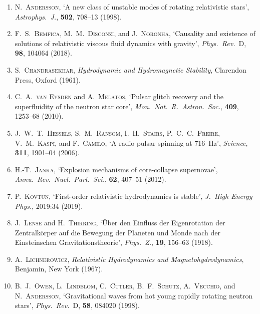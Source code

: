\begin{enumerate}
\item N.~\textsc{Andersson}, `A new class of unstable modes of
  rotating relativistic stars', \emph{Astrophys.\ J.}, \textbf{502},
  708--13 (1998).

\item F.~S.~\textsc{Bemfica}, M.~M.~\textsc{Disconzi}, and
  J.~\textsc{Noronha}, `Causality and existence of solutions of
  relativistic viscous fluid dynamics with gravity',
  \emph{Phys.\ Rev.}~D, \textbf{98}, 104064 (2018).

\item S.~\textsc{Chandrasekhar}, \emph{Hydrodynamic and
  Hydromagnetic Stability}, Clarendon Press, Oxford (1961).

\item C.~A.~\textsc{van Eysden} and A.~\textsc{Melatos}, `Pulsar
  glitch recovery and the superfluidity of the neutron star core',
  \emph{Mon.\ Not.\ R.\ Astron.\ Soc.}, \textbf{409}, 1253--68
  (2010).

\item J.~W.~T.~\textsc{Hessels}, S.~M.~\textsc{Ransom},
  I.~H.~\textsc{Stairs}, P.~C.~C.~\textsc{Freire},
  V.~M.~\textsc{Kaspi}, and F.~\textsc{Camilo}, `A radio pulsar
  spinning at 716~Hz', \emph{Science}, \textbf{311}, 1901--04 (2006).

\item H.-T.~\textsc{Janka}, `Explosion mechanisms of core-collapse
  supernovae', \emph{Annu.\ Rev.\ Nucl.\ Part.\ Sci.}, \textbf{62},
  407--51 (2012).

\item P.~\textsc{Kovtun}, `First-order relativistic hydrodynamics
  is stable', \emph{J.\ High Energy Phys.}, 2019:34 (2019).

\item J.~\textsc{Lense} and H.~\textsc{Thirring}, `\"Uber den Einfluss
  der Eigenrotation der Zentralk\"orper auf die Bewegung der Planeten
  und Monde nach der Einsteinschen Gravitationstheorie',
  \emph{Phys.\ Z.}, \textbf{19}, 156--63 (1918).

\item A.~\textsc{Lichnerowicz}, \emph{Relativistic Hydrodynamics and
  Magnetohydrodynamics}, Benjamin, New York (1967).

\item B.~J.~\textsc{Owen}, L.~\textsc{Lindblom},
  C.~\textsc{Cutler}, B.~F.~\textsc{Schutz},
  A.~\textsc{Vecchio}, and N.~\textsc{Andersson}, `Gravitational
  waves from hot young rapidly rotating neutron stars',
  \emph{Phys.\ Rev.}~D, \textbf{58}, 084020 (1998).


\end{enumerate}
